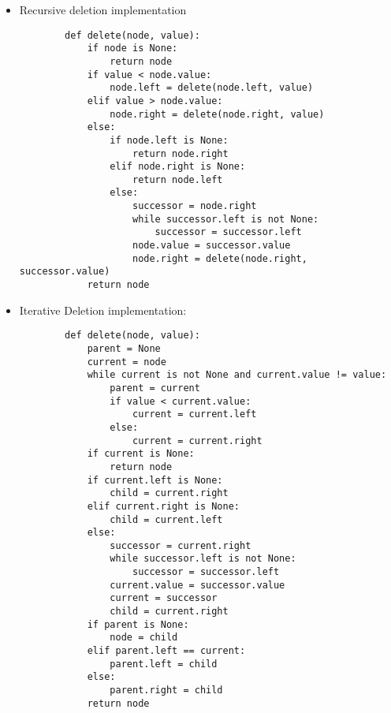 \documentclass[a4paper, 11pt, oneside]{book} %
\begin{document}
\begin{itemize}
    \item Recursive deletion implementation
        \begin{lstlisting}
        def delete(node, value):
            if node is None:
                return node
            if value < node.value:
                node.left = delete(node.left, value)
            elif value > node.value:
                node.right = delete(node.right, value)
            else:
                if node.left is None:
                    return node.right
                elif node.right is None:
                    return node.left
                else:
                    successor = node.right
                    while successor.left is not None:
                        successor = successor.left
                    node.value = successor.value
                    node.right = delete(node.right, successor.value)
            return node
        \end{lstlisting}
    \item Iterative Deletion implementation:
        \begin{lstlisting}
        def delete(node, value):
            parent = None
            current = node
            while current is not None and current.value != value:
                parent = current
                if value < current.value:
                    current = current.left
                else:
                    current = current.right
            if current is None:
                return node
            if current.left is None:
                child = current.right
            elif current.right is None:
                child = current.left
            else:
                successor = current.right
                while successor.left is not None:
                    successor = successor.left
                current.value = successor.value
                current = successor
                child = current.right
            if parent is None:
                node = child
            elif parent.left == current:
                parent.left = child
            else:
                parent.right = child
            return node
        \end{lstlisting}

\end{itemize}
\end{document}

